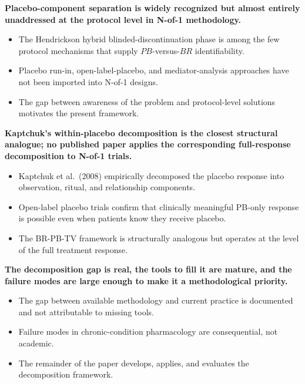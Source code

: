 \documentclass[
  11pt,
]{article}
\begin{document}
\textbf{Placebo-component separation is widely recognized but almost entirely unaddressed at the protocol level in N-of-1 methodology.}

\begin{itemize}\setlength{\itemsep}{2pt}\setlength{\parskip}{0pt}
\item The Hendrickson hybrid blinded-discontinuation phase is among the few protocol mechanisms that supply $PB$-versus-$BR$ identifiability.
\item Placebo run-in, open-label-placebo, and mediator-analysis approaches have not been imported into N-of-1 designs.
\item The gap between awareness of the problem and protocol-level solutions motivates the present framework.
\end{itemize}

\textbf{Kaptchuk's within-placebo decomposition is the closest structural analogue; no published paper applies the corresponding full-response decomposition to N-of-1 trials.}

\begin{itemize}\setlength{\itemsep}{2pt}\setlength{\parskip}{0pt}
\item Kaptchuk et al.\ (2008) empirically decomposed the placebo response into observation, ritual, and relationship components.
\item Open-label placebo trials confirm that clinically meaningful PB-only response is possible even when patients know they receive placebo.
\item The BR-PB-TV framework is structurally analogous but operates at the level of the full treatment response.
\end{itemize}

\textbf{The decomposition gap is real, the tools to fill it are mature, and the failure modes are large enough to make it a methodological priority.}

\begin{itemize}\setlength{\itemsep}{2pt}\setlength{\parskip}{0pt}
\item The gap between available methodology and current practice is documented and not attributable to missing tools.
\item Failure modes in chronic-condition pharmacology are consequential, not academic.
\item The remainder of the paper develops, applies, and evaluates the decomposition framework.
\end{itemize}
\end{document}
